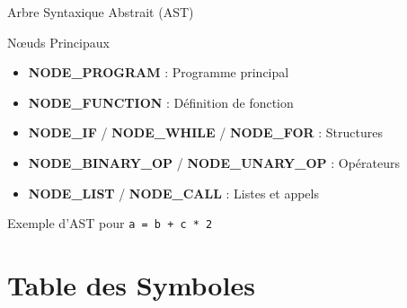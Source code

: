 \documentclass[10pt]{beamer}
\begin{document}
\begin{frame}{Arbre Syntaxique Abstrait (AST)}
    \begin{block}{Nœuds Principaux}
        \begin{itemize}
            \item \textbf{NODE\_PROGRAM} : Programme principal
            \item \textbf{NODE\_FUNCTION} : Définition de fonction
            \item \textbf{NODE\_IF} / \textbf{NODE\_WHILE} / \textbf{NODE\_FOR} : Structures
            \item \textbf{NODE\_BINARY\_OP} / \textbf{NODE\_UNARY\_OP} : Opérateurs
            \item \textbf{NODE\_LIST} / \textbf{NODE\_CALL} : Listes et appels
        \end{itemize}
    \end{block}
    
    \begin{block}{Exemple d'AST pour \texttt{a = b + c * 2}}
        \begin{center}
        \end{center}
    \end{block}
\end{frame}

\section{Table des Symboles}
\end{document}
